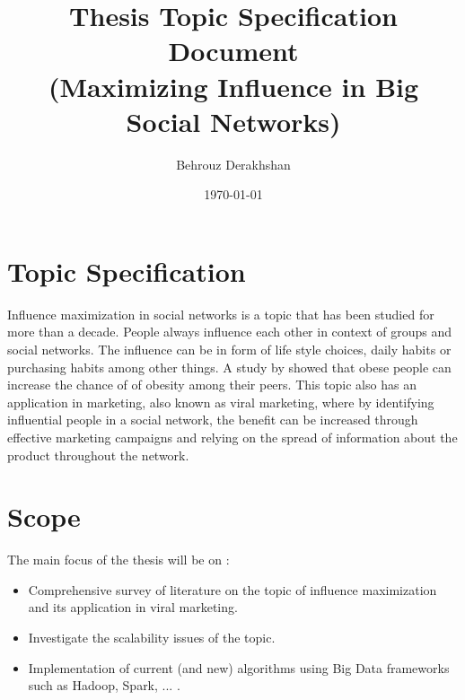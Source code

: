 \documentclass[english]{tktltiki}
\begin{document}
\onehalfspacing

\title{Thesis Topic Specification Document \\ (Maximizing Influence in Big Social Networks)}
\author{Behrouz Derakhshan}
\date{\today}

\maketitle


\section{Topic Specification}
Influence maximization in social networks is a topic that has been studied for more than a decade. People always influence each other in context of groups and social networks. The influence can be in form of life style choices, daily habits or purchasing habits among other things. A study by \cite{christ07} showed that obese people can increase the chance of of obesity among their peers. This topic also has an application in marketing, also known as viral marketing,  where by identifying influential people in a social network, the benefit can be increased through effective marketing campaigns and relying on the spread of information about the product throughout the network. 
\section{Scope}
The main focus of the thesis will be on :
\begin{itemize}
\item Comprehensive survey of literature on the topic of influence maximization and its application in viral marketing.
\item Investigate the scalability issues of the topic.
\item Implementation of current (and new) algorithms using Big Data frameworks  such as Hadoop, Spark, ... .
\end{itemize}
\end{document}
